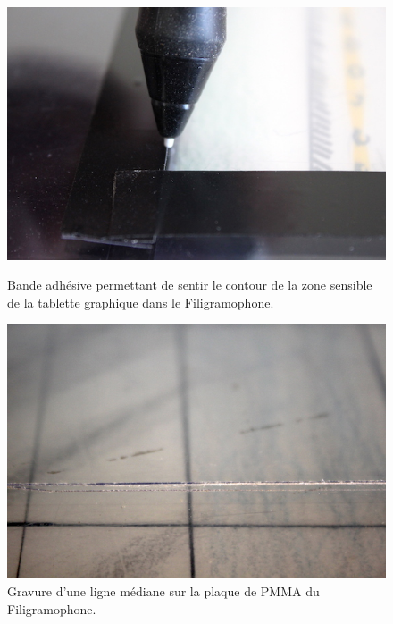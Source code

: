 \begin{figure}[!htbp]
	\captionsetup{format=plain}%
	\centering
	\begin{minipage}[t]{0.48\textwidth}
		\includegraphics[width=\linewidth]{gfx/05_interfaces/filigramophone-adhesif_72dpi.jpg}
		\caption[Bande adhésive permettant de sentir le contour de la zone sensible de la tablette graphique dans le Filigramophone]{Bande adhésive permettant de sentir le contour de la zone sensible de la tablette graphique dans le Filigramophone.}
		\label{fig:interface:filigramophone-adhesif}
	\end{minipage}
	\hspace{.02\linewidth}
	\begin{minipage}[t]{0.48\textwidth}
	    \includegraphics[width=\linewidth]{gfx/05_interfaces/Filigramophone_gravure_72dpi.jpg}
		\caption[Gravure d'une ligne médiane sur la plaque de PMMA du Filigramophone]{Gravure d'une ligne médiane sur la plaque de \gls{PMMA} du Filigramophone.}
		\label{fig:interface:filigramophone-plexigravure}
	\end{minipage}
\end{figure}

